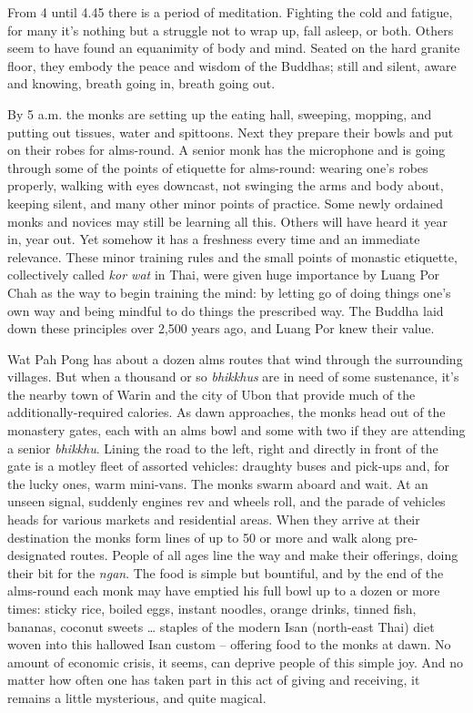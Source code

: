 From 4 until 4.45 there is a period of meditation. Fighting the cold and
fatigue, for many it's nothing but a struggle not to wrap up, fall
asleep, or both. Others seem to have found an equanimity of body and
mind. Seated on the hard granite floor, they embody the peace and wisdom
of the Buddhas; still and silent, aware and knowing, breath going in, 
breath going out. 

By 5 a.m. the monks are setting up the eating hall, sweeping, mopping, 
and putting out tissues, water and spittoons. Next they prepare their
bowls and put on their robes for alms-round. A senior
monk has the microphone and is going through some of the points of
etiquette for alms-round: wearing one's robes properly, walking with
eyes downcast, not swinging the arms and body about, keeping silent, and
many other minor points of practice. Some newly ordained monks and
novices may still be learning all this. Others will have heard it year
in, year out. Yet somehow it has a freshness every time and an immediate
relevance. These minor training rules and the small points of monastic
etiquette, collectively called \emph{kor wat} in Thai, were given huge
importance by Luang Por Chah as the way to begin training the mind: by
letting go of doing things one's own way and being mindful to do things
the prescribed way. The Buddha laid down these principles over 2,500
years ago, and Luang Por knew their value. 

Wat Pah Pong has about a dozen alms routes that wind through the
surrounding villages. But when a thousand or so \emph{bhikkhus} are in need of
some sustenance, it's the nearby town of Warin and the city of Ubon that
provide much of the additionally-required calories. As dawn approaches, 
the monks head out of the monastery gates, each with an alms bowl and
some with two if they are attending a senior \emph{bhikkhu}. Lining the
road to the left, right and directly in front of the gate is a motley
fleet of assorted vehicles: draughty buses and pick-ups and, for the
lucky ones, warm mini-vans. The monks swarm aboard and wait. At an
unseen signal, suddenly engines rev and wheels roll, and the parade of
vehicles heads for various markets and residential areas. When they
arrive at their destination the monks form lines of up to 50 or more
and walk along pre-designated routes. People of all ages line the way
and make their offerings, doing their bit for the \emph{ngan}. The food
is simple but bountiful, and by the end of the alms-round each monk may
have emptied his full bowl up to a dozen or more times: sticky rice, 
boiled eggs, instant noodles, orange drinks, tinned fish, bananas, 
coconut sweets \ldots{} staples of the modern Isan (north-east Thai)
diet woven into this hallowed Isan custom -- offering food to the monks
at dawn. No amount of economic crisis, it seems, can deprive people of
this simple joy. And no matter how often one has taken part in this act
of giving and receiving, it remains a little mysterious, and quite
magical. 

